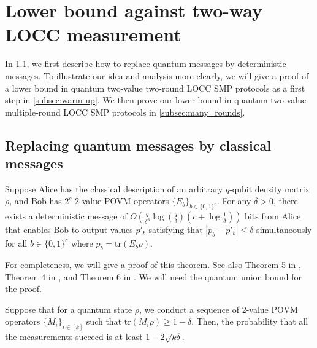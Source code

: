 \section{Lower bound against two-way LOCC measurement}\label{sec:two-way_locc}

In \cref{subsec:replace}, we first describe how to replace quantum messages by deterministic messages. To illustrate our idea and analysis more clearly, we will give a proof of a lower bound in quantum two-value two-round LOCC SMP protocols as a first step in \cref{subsec:warm-up}. We then prove our lower bound in quantum two-value multiple-round LOCC SMP protocols in \cref{subsec:many_rounds}.

\subsection{Replacing quantum messages by classical messages}\label{subsec:replace}

\begin{lemma}\label{lem:replace}
    Suppose Alice has the classical description of an arbitrary $q$-qubit density matrix $\rho$, and Bob has $2^c$ $2$-value POVM operators $\{E_b\}_{b \in \{0,1\}^c}$. For any $\delta >0$, there exists a deterministic message of $O(\frac{q}{\delta^3} \log (\frac{q}{\delta}) (c+ \log \frac{1}{\delta}) )$ bits from Alice that enables Bob to output values $p'_b$ satisfying that $|p_b-p'_b| \leq \delta$ simultaneously for all $b \in \{0,1\}^c$ where $p_b = \mathrm{tr}(E_b \rho)$.
\end{lemma}

For completeness, we will give a proof of this theorem. See also Theorem 5 in \cite{GRdW08}, Theorem 4 in \cite{Aar18}, and Theorem 6 in \cite{ACH+18}. We will need the quantum union bound for the proof.

\begin{lemma}\label{lem:quantum_union_bound}
    Suppose that for a quantum state $\rho$, we conduct a sequence of 2-value POVM operators $\{M_i\}_{i\in[k]}$ such that $\mathrm{tr}(M_i \rho) \geq 1 - \delta$. Then, the probability that all the measurements succeed is at least $1-2\sqrt{k\delta}$.
\end{lemma}

